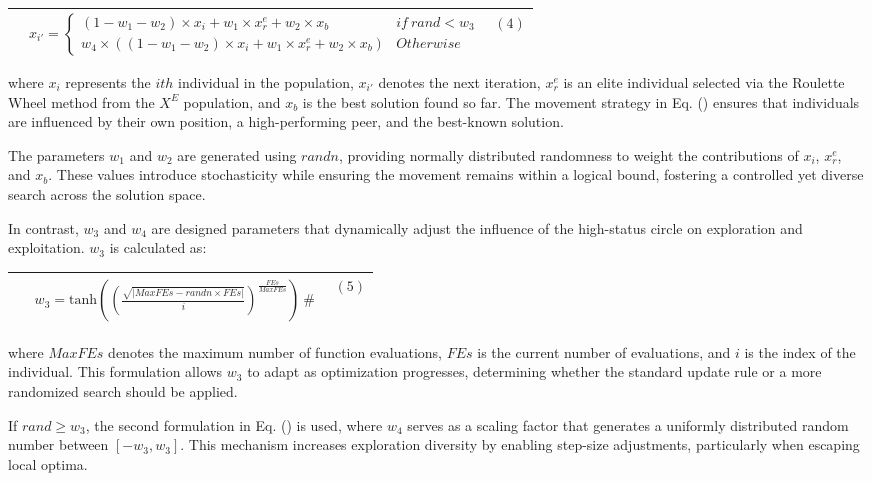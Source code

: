 \documentclass{article} %
\begin{document}
\begin{tabular}{|p{0.2in}|p{3.5in}|p{0.2in}|} \hline 
 & $x_{i'}=\left\{ \begin{array}{cc}
\left(1-w_1-w_2\right)\times x_i+w_1\times x^e_r+w_2\times x_b & if\ rand<w_3 \\ 
w_4\times \left(\left(1-w_1-w_2\right)\times x_i+w_1\times x^e_r+w_2\times x_b\right) & Otherwise \end{array}
\right.$ & $\left(\mathrm{4}\right)$ \\ \hline 
\end{tabular}

where $x_i$ represents the $ith$ individual in the population, $x_{i'}$ denotes the next iteration, $x^e_r$ is an elite individual selected via the Roulette Wheel method from the $X^E$ population, and $x_b$ is the best solution found so far. The movement strategy in Eq. \left(\right) ensures that individuals are influenced by their own position, a high-performing peer, and the best-known solution.

The parameters $w_1$ and $w_2$ are generated using $randn$, providing normally distributed randomness to weight the contributions of $x_i$, $x^e_r$, and $x_b$. These values introduce stochasticity while ensuring the movement remains within a logical bound, fostering a controlled yet diverse search across the solution space.

In contrast, $w_3$ and $w_4$ are designed parameters that dynamically adjust the influence of the high-status circle on exploration and exploitation. $w_3$ is calculated as:

\begin{tabular}{|p{0.4in}|p{3.1in}|p{0.4in}|} \hline 
 & $ \begin{array}{c}
w_3={\mathrm{tanh} \left({\left(\frac{\sqrt{\left|MaxFEs-randn\times FEs\right|}}{i}\right)}^{\frac{FEs}{MaxFEs}}\right)\ }\# \end{array}
$ & $\left(\mathrm{5}\right)$ \\ \hline 
\end{tabular}

where $MaxFEs$ denotes the maximum number of function evaluations, $FEs$ is the current number of evaluations, and $i$ is the index of the individual. This formulation allows $w_3$ to adapt as optimization progresses, determining whether the standard update rule or a more randomized search should be applied.

If $rand\ge w_3$, the second formulation in Eq. \left(\right) is used, where $w_4$ serves as a scaling factor that generates a uniformly distributed random number between $[-w_3,w_3]$. This mechanism increases exploration diversity by enabling step-size adjustments, particularly when escaping local optima.
\end{document}
